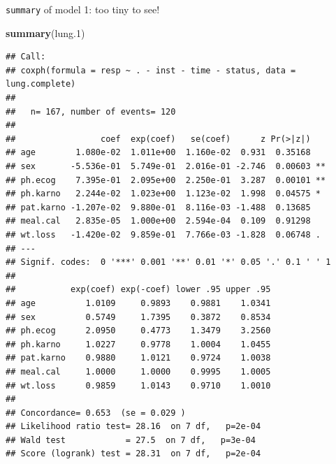 \documentclass[
  ignorenonframetext,
]{beamer}
\newenvironment{Shaded}{\begin{snugshade}}{\end{snugshade}}
\newcommand{\FloatTok}[1]{\textcolor[rgb]{0.00,0.00,0.81}{#1}}
\newcommand{\KeywordTok}[1]{\textcolor[rgb]{0.13,0.29,0.53}{\textbf{#1}}}
\newcommand{\NormalTok}[1]{#1}
\begin{document}
\begin{frame}[fragile]{\texttt{summary} of model 1: too tiny to see!}
\protect\hypertarget{summary-of-model-1-too-tiny-to-see}{}

\tiny

\begin{Shaded}
\begin{Highlighting}[]
\KeywordTok{summary}\NormalTok{(lung}\FloatTok{.1}\NormalTok{)}
\end{Highlighting}
\end{Shaded}

\begin{verbatim}
## Call:
## coxph(formula = resp ~ . - inst - time - status, data = lung.complete)
## 
##   n= 167, number of events= 120 
## 
##                 coef  exp(coef)   se(coef)      z Pr(>|z|)   
## age        1.080e-02  1.011e+00  1.160e-02  0.931  0.35168   
## sex       -5.536e-01  5.749e-01  2.016e-01 -2.746  0.00603 **
## ph.ecog    7.395e-01  2.095e+00  2.250e-01  3.287  0.00101 **
## ph.karno   2.244e-02  1.023e+00  1.123e-02  1.998  0.04575 * 
## pat.karno -1.207e-02  9.880e-01  8.116e-03 -1.488  0.13685   
## meal.cal   2.835e-05  1.000e+00  2.594e-04  0.109  0.91298   
## wt.loss   -1.420e-02  9.859e-01  7.766e-03 -1.828  0.06748 . 
## ---
## Signif. codes:  0 '***' 0.001 '**' 0.01 '*' 0.05 '.' 0.1 ' ' 1
## 
##           exp(coef) exp(-coef) lower .95 upper .95
## age          1.0109     0.9893    0.9881    1.0341
## sex          0.5749     1.7395    0.3872    0.8534
## ph.ecog      2.0950     0.4773    1.3479    3.2560
## ph.karno     1.0227     0.9778    1.0004    1.0455
## pat.karno    0.9880     1.0121    0.9724    1.0038
## meal.cal     1.0000     1.0000    0.9995    1.0005
## wt.loss      0.9859     1.0143    0.9710    1.0010
## 
## Concordance= 0.653  (se = 0.029 )
## Likelihood ratio test= 28.16  on 7 df,   p=2e-04
## Wald test            = 27.5  on 7 df,   p=3e-04
## Score (logrank) test = 28.31  on 7 df,   p=2e-04
\end{verbatim}

\normalsize

\end{frame}
\end{document}
